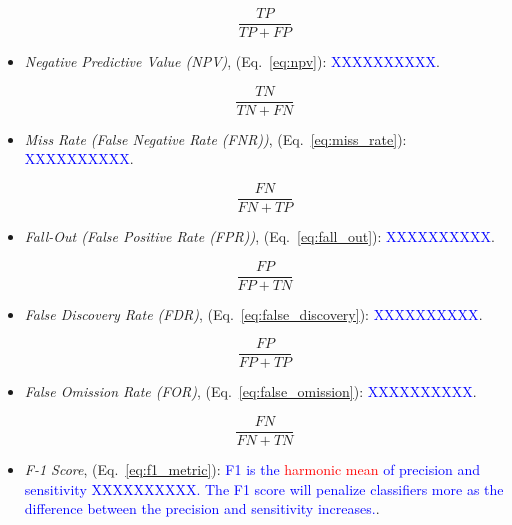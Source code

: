\begin{itemize}[noitemsep,topsep=0pt]
\begin{equation}
{\frac{TP}{TP+FP}}
\label{eq:precision}
\end{equation}

\item \textit{Negative Predictive Value (NPV)}, (Eq.~\ref{eq:npv}): \textcolor{blue}{XXXXXXXXXX}.

\begin{equation}
{\frac{TN}{TN+FN}}
\label{eq:npv}
\end{equation}

\item \textit{Miss Rate (False Negative Rate (FNR))}, (Eq.~\ref{eq:miss_rate}): \textcolor{blue}{XXXXXXXXXX}.

\begin{equation}
{\frac{FN}{FN+TP}}
\label{eq:miss_rate}
\end{equation}

\item \textit{Fall-Out (False Positive Rate (FPR))}, (Eq.~\ref{eq:fall_out}): \textcolor{blue}{XXXXXXXXXX}.

\begin{equation}
{\frac{FP}{FP+TN}}
\label{eq:fall_out}
\end{equation}

\item \textit{False Discovery Rate (FDR)}, (Eq.~\ref{eq:false_discovery}): \textcolor{blue}{XXXXXXXXXX}.

\begin{equation}
{\frac{FP}{FP+TP}}
\label{eq:false_discovery}
\end{equation}

\item \textit{False Omission Rate (FOR)}, (Eq.~\ref{eq:false_omission}): \textcolor{blue}{XXXXXXXXXX}.

\begin{equation}
{\frac{FN}{FN+TN}}
\label{eq:false_omission}
\end{equation}

\item \textit{F-1 Score}, (Eq.~\ref{eq:f1_metric}): \textcolor{blue}{F1 is the \textcolor{red}{harmonic mean} of precision and sensitivity XXXXXXXXXX. The F1 score will penalize classifiers more as the difference between the precision and sensitivity increases.}.


\end{itemize}
